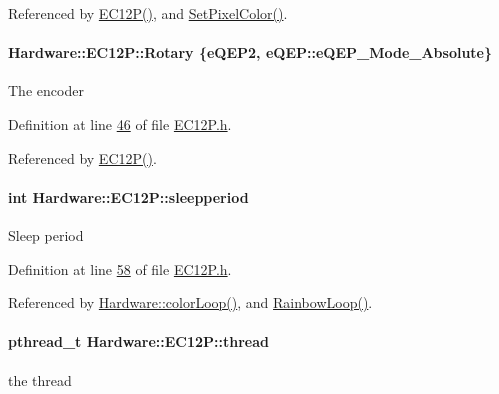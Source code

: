 Referenced by \hyperlink{_e_c12_p_8cpp_source_l00012}{E\+C12\+P()}, and \hyperlink{_e_c12_p_8cpp_source_l00035}{Set\+Pixel\+Color()}.

\hypertarget{class_hardware_1_1_e_c12_p_abfe8d6ea8948c77d4866ca8a05dbebe9}{}
\paragraph[{Rotary}]{ Hardware\+::\+E\+C12\+P\+::\+Rotary \{{\bf e\+Q\+E\+P2}, {\bf e\+Q\+E\+P\+::e\+Q\+E\+P\+\_\+\+Mode\+\_\+\+Absolute}\}}\label{class_hardware_1_1_e_c12_p_abfe8d6ea8948c77d4866ca8a05dbebe9}
The encoder 

Definition at line \hyperlink{_e_c12_p_8h_source_l00046}{46} of file \hyperlink{_e_c12_p_8h_source}{E\+C12\+P.\+h}.



Referenced by \hyperlink{_e_c12_p_8cpp_source_l00012}{E\+C12\+P()}.

\hypertarget{class_hardware_1_1_e_c12_p_adff7ed51fd97bac61075c88a06102348}{}
\paragraph[{sleepperiod}]{\setlength{\rightskip}{0pt plus 5cm}int Hardware\+::\+E\+C12\+P\+::sleepperiod\hspace{0.3cm}{\ttfamily [private]}}\label{class_hardware_1_1_e_c12_p_adff7ed51fd97bac61075c88a06102348}
Sleep period 

Definition at line \hyperlink{_e_c12_p_8h_source_l00058}{58} of file \hyperlink{_e_c12_p_8h_source}{E\+C12\+P.\+h}.



Referenced by \hyperlink{_e_c12_p_8cpp_source_l00091}{Hardware\+::color\+Loop()}, and \hyperlink{_e_c12_p_8cpp_source_l00082}{Rainbow\+Loop()}.

\hypertarget{class_hardware_1_1_e_c12_p_a718a90836ff46cd71d18ce099a656533}{}
\paragraph[{thread}]{\setlength{\rightskip}{0pt plus 5cm}pthread\+\_\+t Hardware\+::\+E\+C12\+P\+::thread\hspace{0.3cm}{\ttfamily [private]}}\label{class_hardware_1_1_e_c12_p_a718a90836ff46cd71d18ce099a656533}
the thread 

